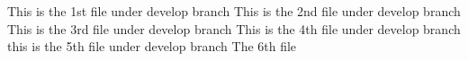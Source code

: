 This is the 1st file under develop branch
This is the 2nd file under develop branch
This is the 3rd file under develop branch
This is the 4th file under develop branch
this is the 5th file under develop branch
The 6th file   
